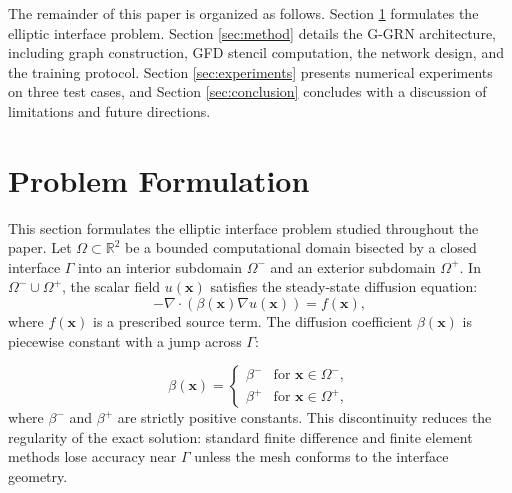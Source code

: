 \documentclass[11pt]{article}
\theoremstyle{definition}
\theoremstyle{remark}
\theoremstyle{plain}
\begin{document}
The remainder of this paper is organized as follows. Section \ref{sec:problem} formulates the elliptic interface problem. Section \ref{sec:method} details the G-GRN architecture, including graph construction, GFD stencil computation, the network design, and the training protocol. Section \ref{sec:experiments} presents numerical experiments on three test cases, and Section \ref{sec:conclusion} concludes with a discussion of limitations and future directions.

\section{Problem Formulation}
\label{sec:problem}

This section formulates the elliptic interface problem studied throughout the paper. Let $\Omega \subset \mathbb{R}^2$ be a bounded computational domain bisected by a closed interface $\Gamma$ into an interior subdomain $\Omega^-$ and an exterior subdomain $\Omega^+$. In $\Omega^- \cup \Omega^+$, the scalar field $u(\mathbf{x})$ satisfies the steady-state diffusion equation:
\begin{equation}
    -\nabla \cdot (\beta(\mathbf{x}) \nabla u(\mathbf{x})) = f(\mathbf{x}),
\end{equation}
where $f(\mathbf{x})$ is a prescribed source term. The diffusion coefficient $\beta(\mathbf{x})$ is piecewise constant with a jump across $\Gamma$:

\begin{equation}
    \beta(\mathbf{x}) =
    \begin{cases}
        \beta^- & \text{for } \mathbf{x} \in \Omega^-, \\
        \beta^+ & \text{for } \mathbf{x} \in \Omega^+,
    \end{cases}
\end{equation}
where $\beta^-$ and $\beta^+$ are strictly positive constants. This discontinuity reduces the regularity of the exact solution: standard finite difference \cite{liszka1980finite} and finite element \cite{babuvska1970finite} methods lose accuracy near $\Gamma$ unless the mesh conforms to the interface geometry.
\end{document}
